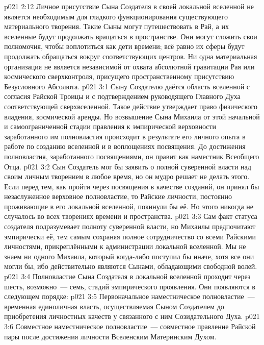 \vs p021 2:12 Личное присутствие Сына Создателя в своей локальной вселенной не является необходимым для гладкого функционирования существующего материального творения. Такие Сыны могут путешествовать в Рай, а их вселенные будут продолжать вращаться в пространстве. Они могут сложить свои полномочия, чтобы воплотиться как дети времени; всё равно их сферы будут продолжать обращаться вокруг соответствующих центров. Ни одна материальная организация не является независимой от охвата абсолютной гравитации Рая или космического сверхконтроля, присущего пространственному присутствию Безусловного Абсолюта.
\vs p021 3:1 Сыну Создателю даётся область вселенной с согласия Райской Троицы и с подтверждением руководящего Главного Духа соответствующей сверхвселенной. Такое действие утверждает право физического владения, космической аренды. Но возвышение Сына Михаила от этой начальной и самоограниченной стадии правления к эмпирической верховности заработанного им полновластия происходит в результате его личного опыта в работе по созданию вселенной и в воплощениях посвящения. До достижения полновластия, заработанного посвящениями, он правит как наместник Всеобщего Отца.
\vs p021 3:2 \pc Сын Создатель мог бы заявить о полной суверенной власти над своим личным творением в любое время, но он мудро решает не делать этого. Если перед тем, как пройти через посвящения в качестве созданий, он принял бы незаслуженное верховное полновластие, то Райские личности, постоянно проживающие в его локальной вселенной, покинули бы её. Но этого никогда не случалось во всех творениях времени и пространства.
\vs p021 3:3 Сам факт статуса создателя подразумевает полноту суверенной власти, но Михаилы предпочитают эмпирически  её, тем самым сохраняя полное сотрудничество со всеми Райскими личностями, прикреплёнными к администрации локальной вселенной. Мы не знаем ни одного Михаила, который когда\hyp{}либо поступил бы иначе, хотя все они могли бы, ибо действительно являются Сынами, обладающими свободной волей.
\vs p021 3:4 \pc Полновластие Сына Создателя в локальной вселенной проходит через шесть, возможно~--- семь, стадий эмпирического проявления. Они появляются в следующем порядке:
\vs p021 3:5 Первоначальное наместническое полновластие~--- временная единоличная власть, осуществляемая Сыном Создателем до приобретения личностных качеств у связанного с ним Созидательного Духа.
\vs p021 3:6 Совместное наместническое полновластие~--- совместное правление Райской пары после достижения личности Вселенским Материнским Духом.
